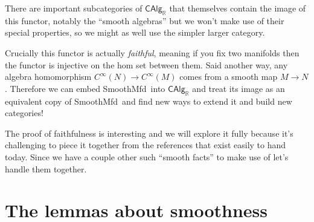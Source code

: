\documentclass[12pt]{article}
\newcommand{\rr}{\ensuremath{\mathbb{R}}}
\newcommand{\cinfty}{\ensuremath{C^{\infty}}}
\newcommand{\smfd}{\textsf{SmoothMfd}}
\newcommand{\calg}{\textsf{CAlg}_{\rr}}
\begin{document}
There are important subcategories of $\calg$ that themselves contain the image of this functor, notably the ``smooth algebras'' but we won't make use of their special properties, so we might as well use the simpler larger category.

Crucially this functor is actually \emph{faithful}, meaning if you fix two manifolds then the functor is injective on the hom set between them. Said another way, any algebra homomorphism $\cinfty(N)\to\cinfty(M)$ comes from a smooth map $M\to N$. Therefore we can embed \smfd\ into $\calg$ and treat its image as an equivalent copy of \smfd\ and find new ways to extend it and build new categories!

The proof of faithfulness is interesting and we will explore it fully because it's challenging to piece it together from the references that exist easily to hand today. Since we have a couple other such ``smooth facts'' to make use of let's handle them together.

\section{The lemmas about smoothness}\label{sec:smoothnesslemmas}
\end{document}
